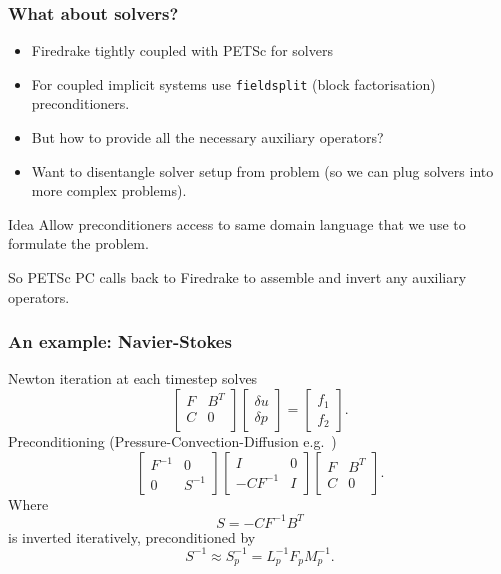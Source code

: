 \documentclass[presentation]{beamer}
\begin{document}
\begin{frame}
  \frametitle{What about solvers?}
  \begin{itemize}
  \item Firedrake tightly coupled with PETSc for solvers
  \item For coupled implicit systems use \texttt{fieldsplit} (block
    factorisation) preconditioners.
  \item But how to provide all the necessary auxiliary operators?
  \item Want to disentangle solver setup from problem (so we can plug
    solvers into more complex problems).
  \end{itemize}
  \begin{block}{Idea}
    Allow preconditioners access to same domain language that we use
    to formulate the problem.

    So PETSc PC calls back to Firedrake to assemble and invert any
    auxiliary operators.
  \end{block}
\end{frame}
\begin{frame}
  \frametitle{An example: Navier-Stokes}
  Newton iteration at each timestep solves
  \begin{equation*}
    \begin{bmatrix}
      F & B^T\\
      C & 0 \\
    \end{bmatrix}
    \begin{bmatrix}
      \delta u\\
      \delta p
    \end{bmatrix}
    = \begin{bmatrix}
      f_1\\
      f_2
    \end{bmatrix}.
  \end{equation*}
  Preconditioning (Pressure-Convection-Diffusion e.g.~\textcite{Elman:2014})
  \begin{equation*}
    \begin{bmatrix}
      F^{-1} & 0 \\
      0 & S^{-1}
    \end{bmatrix}
    \begin{bmatrix}
      I & 0\\
      -CF^{-1} & I
    \end{bmatrix}
    \begin{bmatrix}
      F & B^T \\
      C & 0
    \end{bmatrix}.
  \end{equation*}
  Where
  \begin{equation*}
    S = -C F^{-1} B^T
  \end{equation*}
  is inverted iteratively, preconditioned by
  \begin{equation*}
    S^{-1} \approx S_p^{-1} = L_p^{-1} F_p M_p^{-1}.
  \end{equation*}
\end{frame}
\end{document}
